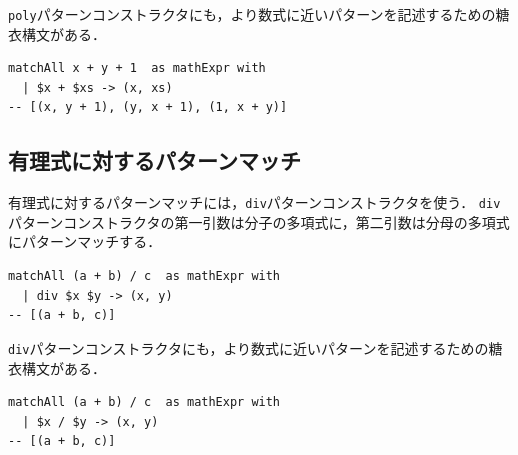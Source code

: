 \lstinline{poly}パターンコンストラクタにも，より数式に近いパターンを記述するための糖衣構文がある．
\begin{lstlisting}[language=egison,numbers=none]
matchAll x + y + 1  as mathExpr with
  | $x + $xs -> (x, xs)
-- [(x, y + 1), (y, x + 1), (1, x + y)]
\end{lstlisting}

\subsection{有理式に対するパターンマッチ}

有理式に対するパターンマッチには，\lstinline{div}パターンコンストラクタを使う．
\lstinline{div}パターンコンストラクタの第一引数は分子の多項式に，第二引数は分母の多項式にパターンマッチする．
\begin{lstlisting}[language=egison,numbers=none]
matchAll (a + b) / c  as mathExpr with
  | div $x $y -> (x, y)
-- [(a + b, c)]
\end{lstlisting}

\lstinline{div}パターンコンストラクタにも，より数式に近いパターンを記述するための糖衣構文がある．
\begin{lstlisting}[language=egison,numbers=none]
matchAll (a + b) / c  as mathExpr with
  | $x / $y -> (x, y)
-- [(a + b, c)]
\end{lstlisting}
